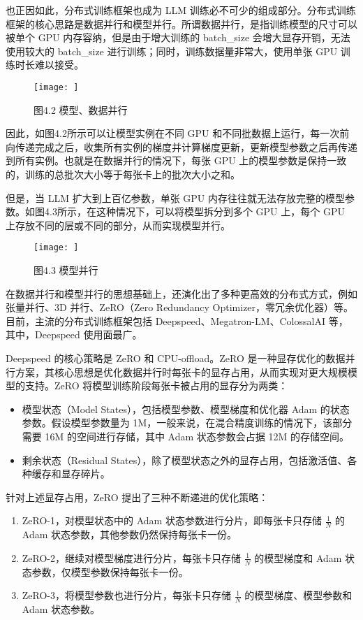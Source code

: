 \documentclass[12pt,a4paper]{book}
\begin{document}
也正因如此，分布式训练框架也成为 LLM
训练必不可少的组成部分。分布式训练框架的核心思路是数据并行和模型并行。所谓数据并行，是指训练模型的尺寸可以被单个
GPU 内存容纳，但是由于增大训练的 batch\_size
会增大显存开销，无法使用较大的 batch\_size
进行训练；同时，训练数据量非常大，使用单张 GPU 训练时长难以接受。

\begin{figure}[htbp]\centering
\texttt{[image: ]}
\caption{图4.2 模型、数据并行}
\end{figure}

因此，如图4.2所示可以让模型实例在不同 GPU
和不同批数据上运行，每一次前向传递完成之后，收集所有实例的梯度并计算梯度更新，更新模型参数之后再传递到所有实例。也就是在数据并行的情况下，每张
GPU
上的模型参数是保持一致的，训练的总批次大小等于每张卡上的批次大小之和。

但是，当 LLM 扩大到上百亿参数，单张 GPU
内存往往就无法存放完整的模型参数。如图4.3所示，在这种情况下，可以将模型拆分到多个
GPU 上，每个 GPU 上存放不同的层或不同的部分，从而实现模型并行。

\begin{figure}[htbp]\centering
\texttt{[image: ]}
\caption{图4.3 模型并行}
\end{figure}

在数据并行和模型并行的思想基础上，还演化出了多种更高效的分布式方式，例如张量并行、3D
并行、ZeRO（Zero Redundancy
Optimizer，零冗余优化器）等。目前，主流的分布式训练框架包括
Deepspeed、Megatron-LM、ColossalAI 等，其中，Deepspeed 使用面最广。

Deepspeed 的核心策略是 ZeRO 和 CPU-offload。ZeRO
是一种显存优化的数据并行方案，其核心思想是优化数据并行时每张卡的显存占用，从而实现对更大规模模型的支持。ZeRO
将模型训练阶段每张卡被占用的显存分为两类：

\begin{itemize}
\tightlist
\item
  模型状态（Model States），包括模型参数、模型梯度和优化器 Adam
  的状态参数。假设模型参数量为
  1M，一般来说，在混合精度训练的情况下，该部分需要 16M
  的空间进行存储，其中 Adam 状态参数会占据 12M 的存储空间。
\item
  剩余状态（Residual
  States），除了模型状态之外的显存占用，包括激活值、各种缓存和显存碎片。
\end{itemize}

针对上述显存占用，ZeRO 提出了三种不断递进的优化策略：

\begin{enumerate}
\def\labelenumi{\arabic{enumi}.}
\tightlist
\item
  ZeRO-1，对模型状态中的 Adam 状态参数进行分片，即每张卡只存储
  \(\frac{1}{N}\) 的 Adam 状态参数，其他参数仍然保持每张卡一份。
\item
  ZeRO-2，继续对模型梯度进行分片，每张卡只存储 \(\frac{1}{N}\)
  的模型梯度和 Adam 状态参数，仅模型参数保持每张卡一份。
\item
  ZeRO-3，将模型参数也进行分片，每张卡只存储 \(\frac{1}{N}\)
  的模型梯度、模型参数和 Adam 状态参数。
\end{enumerate}
\end{document}

